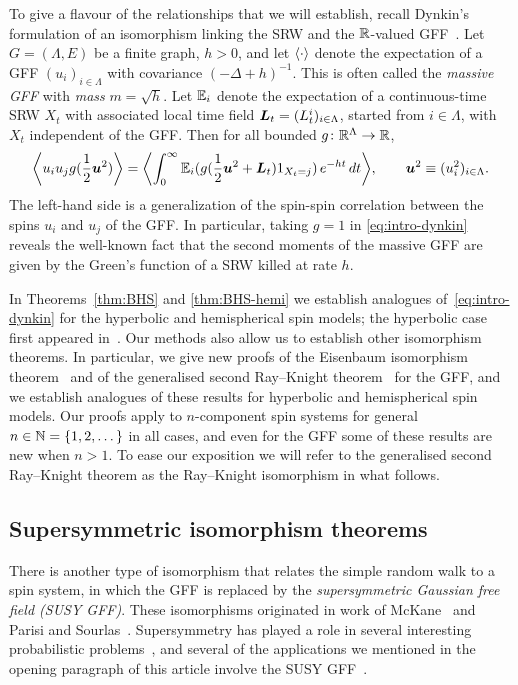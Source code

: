 \documentclass[11pt,a4paper]{article}
\begin{document}
To give a flavour of the relationships that we will establish, recall
Dynkin's formulation of an isomorphism linking the SRW and the
$\mathbb{R}$-valued GFF~\cite{MR734803}. Let $G=(\Lambda,E)$ be a finite
graph, $h>0$, and let $\langle \cdot \rangle$ denote the expectation of a GFF
$(u_{i})_{i\in\Lambda}$ with covariance $(-\Delta + h)^{-1}$. This is
often called the \emph{massive GFF} with \emph{mass} $m=\sqrt{h}$.
Let $\mathbb{E}_{i}$ denote the expectation of a continuous-time SRW $X_{t}$
with associated local time field $\boldsymbol{L}_t = (L_t^i)_{i\in\Lambda}$,
started from $i\in\Lambda$, with $X_{t}$ independent of the GFF. Then
for all bounded $g\colon \mathbb{R}^{\Lambda}\to \mathbb{R}$,
\begin{equation}
  \label{eq:intro-dynkin}
  \spin{u_{i}u_{j} g(\frac{1}{2}\V{u}^{2})} = \spin{
    \int_{0}^{\infty} \E_{i}(g(\frac{1}{2} \V{u}^{2} +    \V{L}_{t}) 1_{X_{t}=j}) \, e^{-ht}\, dt},
  \qquad \V{u}^2 \bydef (u_i^2)_{i\in\Lambda}.
\end{equation}
The left-hand side is a generalization of the spin-spin correlation
between the spins $u_{i}$ and $u_{j}$ of the GFF. In particular,
taking $g=1$ in \eqref{eq:intro-dynkin} reveals the well-known fact
that the second moments of the massive GFF are given by 
the Green's function of a SRW killed at rate $h$.

In Theorems~\ref{thm:BHS} and \ref{thm:BHS-hemi} we establish
analogues of~\eqref{eq:intro-dynkin} for the hyperbolic and
hemispherical spin models; the hyperbolic case first appeared
in~\cite{1802.02077}. Our methods also allow us to establish other
isomorphism theorems. In particular, we give new proofs of the
Eisenbaum isomorphism theorem~\cite{MR1459468} and of the generalised
second Ray--Knight theorem~\cite{MR1813843} for the GFF, and we
establish analogues of these results for hyperbolic and hemispherical
spin models. Our proofs apply to $n$-component spin systems for
general $n \in \mathbb{N} = \{1,2,\dots\}$ in all cases, and even for
the GFF some of these results are new when $n> 1$. To ease our
exposition we will refer to the generalised second Ray--Knight theorem
as the Ray--Knight isomorphism in what follows.


\subsection{Supersymmetric isomorphism theorems}
\label{sec:supersymm-isom-theor}

There is another type of isomorphism that relates the simple random walk
to a spin system, in which the GFF is replaced by the
\emph{supersymmetric Gaussian free field (SUSY GFF)}. These
isomorphisms originated in work of McKane~\cite{MR594576} and Parisi
and Sourlas~\cite{PhysRevLett.43.744}. Supersymmetry has played a role
in several interesting probabilistic
problems~\cite{MR2031859,MR2728731,MR2525670,MR3622573}, and several of the
applications we mentioned in the opening paragraph of this article
involve the SUSY
GFF~\cite{MR1143413,MR3339164,MR1100240,MR2330973,MR941982}.
\end{document}
